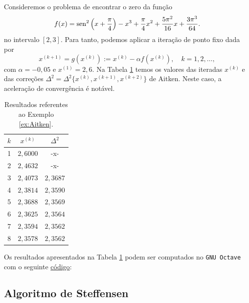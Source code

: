 \begin{ex}\label{ex:Aitken}
  Consideremos o problema de encontrar o zero da função
  \begin{equation}
    f(x) = \operatorname{sen}^2\left(x+\frac{\pi}{4}\right) - x^3 + \frac{\pi}{4}x^2 + \frac{5\pi^2}{16}x + \frac{3\pi^3}{64}.
  \end{equation}
  no intervalo $[2,3]$. Para tanto, podemos aplicar a iteração de ponto fixo dada por
  \begin{equation}
    x^{(k+1)} = g(x^{(k)}) := x^{(k)} - \alpha f(x^{(k)}),\quad k=1,2,\ldots,
  \end{equation}
com $\alpha=-0,05$ e $x^{(1)}=2,6$. Na Tabela \ref{tab:ex_Aitken} temos os valores das iteradas $x^{(k)}$ e das correções $\Delta^2 = \Delta^2\{x^{(k)},x^{(k+1)},x^{(k+2)}\}$ de Aitken. Neste caso, a aceleração de convergência é notável.

\begin{table}[h!]
  \centering
  \caption{Resultados referentes ao Exemplo \ref{ex:Aitken}.}
  \label{tab:ex_Aitken}
  \begin{tabular}{r|cc}
    $k$ & $x^{(k)}$ & $\Delta^2$ \\\hline
    1 & $2,6000$ & -x- \\
    2 & $2,4632$ & -x- \\
    3 & $2,4073$ & $2,3687$ \\
    4 & $2,3814$ & $2,3590$ \\
    5 & $2,3688$ & $2,3569$ \\
    6 & $2,3625$ & $2,3564$ \\
    7 & $2,3594$ & $2,3562$ \\
    8 & $2,3578$ & $2,3562$ \\\hline
  \end{tabular}
\end{table}

\ifisoctave
Os resultados apresentados na Tabela \ref{tab:ex_Aitken} podem ser computados no \verb+GNU Octave+ com o seguinte \href{https://github.com/phkonzen/notas/blob/master/src/MatematicaNumerica/cap_eq1d/dados/ex_Aitken/ex_Aitken.m}{código}:

\fi
\end{ex}

\subsection{Algoritmo de Steffensen}

